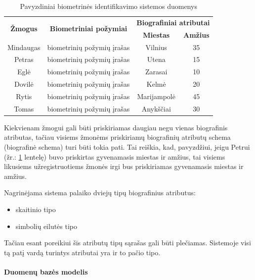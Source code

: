 \begin{table}[H]\footnotesize
	\centering
	\begin{tabular}{|c|c|c|c|}
		\hline
		\multirow{2}{*}{{\bf Žmogus}} & \multirow{2}{*}{{\bf Biometriniai požymiai}} & \multicolumn{2}{|c|}{{\bf Biografiniai atributai}}  \\ \cline{3-4}
		& & {\bf Miestas} & {\bf Amžius} \\
		\hline
		Mindaugas & biometrinių požymių įrašas & Vilnius & 35 \\ \cline{2-4}
		\hline
		Petras & biometrinių požymių įrašas & Utena & 15 \\ \cline{2-4}
		\hline
		Eglė & biometrinių požymių įrašas & Zarasai & 10 \\ \cline{2-4}
		\hline
		Dovilė & biometrinių požymių įrašas & Kelmė & 20 \\ \cline{2-4}
		\hline
		Rytis & biometrinių požymių įrašas & Marijampolė & 45 \\ \cline{2-4}
		\hline
		Tomas & biometrinių požymių įrašas & Anykščiai & 30 \\ \cline{2-4}
		\hline
	\end{tabular}
	\caption{Pavyzdiniai biometrinės identifikavimo sistemos duomenys}
	\label{tab:exampleGallery}
\end{table}

Kiekvienam žmogui gali būti priskiriamas daugiau negu vienas biografinis atributas, tačiau visiems žmonėms priskiriamų biografinių atributų schema (biografinė schema) turi būti tokia pati.
Tai reiškia, kad, pavyzdžiui, jeigu Petrui (žr.: \ref{tab:exampleGallery} lentelę) buvo priskirtas gyvenamasis miestas ir amžius, tai visiems likusiems užregistruotiems žmonės irgi bus priskiriamas gyvenamasis miestas ir amžius.

Nagrinėjama sistema palaiko dviejų tipų biografinius atributus:
\begin{itemize}
\item skaitinio tipo
\item simbolių eilutės tipo
\end{itemize}
Tačiau esant poreikiui šis atributų tipų sąrašas gali būti plečiamas.
Sistemoje visi tą patį vardą turintys atributai yra ir to pačio tipo.






\paragraph{Duomenų bazės modelis}

